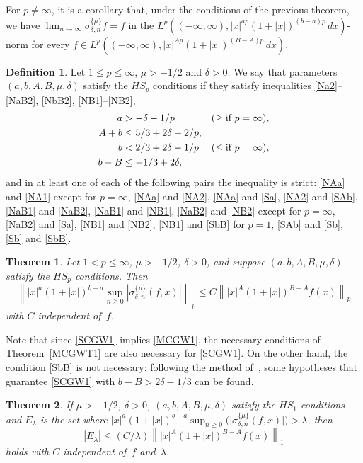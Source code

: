 \documentclass{amsart}
\theoremstyle{plain}
\newtheorem{Theo}{Theorem}
\theoremstyle{definition}
\newtheorem{Def}{Definition}
\theoremstyle{remark}
\newcommand{\chem}[3]{\sigma_{#1,#2}^{\{#3\}}} %
\newcommand{\I}{\infty}
\begin{document}
For $p\ne\infty$, it is a corollary that,
under the conditions of the previous theorem, we have
$\displaystyle{\lim_{n\to\infty}\chem{\delta}{n}{\mu}f=f}$
in the $L^p((-\I,\I),|x|^{ap}(1+|x|)^{(b-a)p}\,dx)$-norm for every
$f \in L^p((-\I,\I),|x|^{Ap}(1+|x|)^{(B-A)p}\,dx)$.

\begin{Def}
\label{SNp}
Let $1\le p\le\infty$, $\mu>-1/2$ and $\delta>0$. We say that parameters
$(a,b,A,B,\mu,\delta)$ satisfy the $H\!S_p$ conditions if they satisfy inequalities
\eqref{Na2}--\eqref{NaB2}, \eqref{NbB2}, \eqref{NB1}--\eqref{NB2},
\begin{align}
\label{Sa} a &> -\delta-1/p && (\ge\textup{if } p=\I),\\
\label{SAb} A+b &\le 5/3+2\delta-2/p,\\
\label{Sb} b &< 2/3+2\delta-1/p && (\le\textup{if } p=\I),\\
\label{SbB} b-B &\le -1/3 + 2\delta,
\end{align}
and in at least one of each of the following pairs
the inequality is strict:
\eqref{NAa} and \eqref{NA1} except for $p=\I$,
\eqref{NAa} and \eqref{NA2},
\eqref{NAa} and \eqref{Sa},
\eqref{NA2} and \eqref{SAb},
\eqref{NaB1} and \eqref{NaB2},
\eqref{NaB1} and \eqref{NB1},
\eqref{NaB2} and \eqref{NB2} except for $p=\I$,
\eqref{NaB2} and \eqref{Sa},
\eqref{NB1} and \eqref{NB2},
\eqref{NB1} and \eqref{SbB} for $p=1$,
\eqref{SAb} and \eqref{Sb},
\eqref{Sb} and \eqref{SbB}.
\end{Def}

\begin{Theo}
\label{MCGW2}
Let $1<p\le\infty$, $\mu>-1/2$, $\delta>0$, and suppose $(a,b,A,B,\mu,\delta)$ satisfy
the $H\!S_p$ conditions. Then
\begin{equation}
\label{SCGW1}
  \left\| |x|^a(1+|x|)^{b-a}\sup_{n\ge0}|\chem{\delta}{n}{\mu}(f,x)| \right\|_p
  \le C \left\| |x|^A(1+|x|)^{B-A}f(x) \right\|_p
\end{equation}
with $C$ independent of~$f$.
\end{Theo}

Note that since \eqref{SCGW1} implies \eqref{MCGW1}, the necessary conditions of
Theorem~\ref{MCGWT1} are also necessary for \eqref{SCGW1}. On the other hand, the condition
\eqref{SbB} is not necessary: following the method of~\cite[\S\,10]{MW}, some hypotheses that
guarantee \eqref{SCGW1} with $b-B>2\delta-1/3$ can be found.

\begin{Theo}
\label{WK} If $\mu>-1/2$, $\delta>0$, $(a,b,A,B,\mu,\delta)$ satisfy the $H\!S_1$ conditions and
$E_{\lambda}$ is the set where $|x|^a(1+|x|)^{b-a} \sup_{n\ge0}
\bigl(\bigl|\chem{\delta}{n}{\mu}(f,x)\bigr|\bigr) > \lambda$, then
\[
  \left|E_\lambda\right|
  \le (C/\lambda) \left\| |x|^A(1+|x|)^{B-A}f(x) \right\|_1
\]
holds with $C$ independent of~$f$ and~$\lambda$.
\end{Theo}
\end{document}
